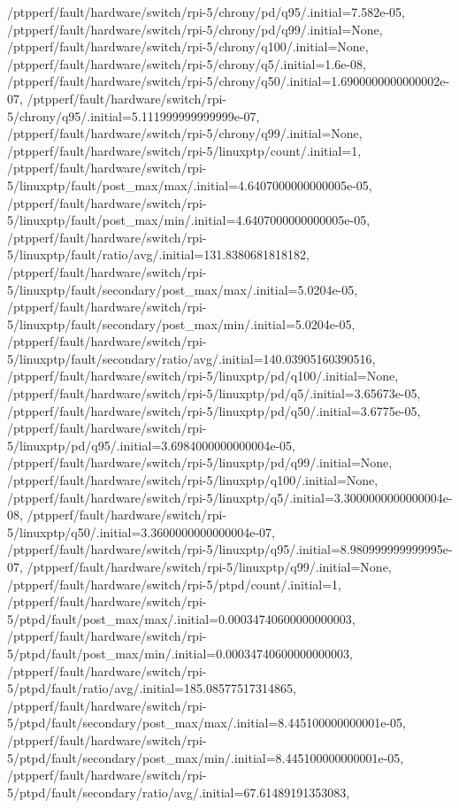 {    /ptpperf/fault/hardware/switch/rpi-5/chrony/pd/q95/.initial=7.582e-05,
    /ptpperf/fault/hardware/switch/rpi-5/chrony/pd/q99/.initial=None,
    /ptpperf/fault/hardware/switch/rpi-5/chrony/q100/.initial=None,
    /ptpperf/fault/hardware/switch/rpi-5/chrony/q5/.initial=1.6e-08,
    /ptpperf/fault/hardware/switch/rpi-5/chrony/q50/.initial=1.6900000000000002e-07,
    /ptpperf/fault/hardware/switch/rpi-5/chrony/q95/.initial=5.111999999999999e-07,
    /ptpperf/fault/hardware/switch/rpi-5/chrony/q99/.initial=None,
    /ptpperf/fault/hardware/switch/rpi-5/linuxptp/count/.initial=1,
    /ptpperf/fault/hardware/switch/rpi-5/linuxptp/fault/post_max/max/.initial=4.6407000000000005e-05,
    /ptpperf/fault/hardware/switch/rpi-5/linuxptp/fault/post_max/min/.initial=4.6407000000000005e-05,
    /ptpperf/fault/hardware/switch/rpi-5/linuxptp/fault/ratio/avg/.initial=131.8380681818182,
    /ptpperf/fault/hardware/switch/rpi-5/linuxptp/fault/secondary/post_max/max/.initial=5.0204e-05,
    /ptpperf/fault/hardware/switch/rpi-5/linuxptp/fault/secondary/post_max/min/.initial=5.0204e-05,
    /ptpperf/fault/hardware/switch/rpi-5/linuxptp/fault/secondary/ratio/avg/.initial=140.03905160390516,
    /ptpperf/fault/hardware/switch/rpi-5/linuxptp/pd/q100/.initial=None,
    /ptpperf/fault/hardware/switch/rpi-5/linuxptp/pd/q5/.initial=3.65673e-05,
    /ptpperf/fault/hardware/switch/rpi-5/linuxptp/pd/q50/.initial=3.6775e-05,
    /ptpperf/fault/hardware/switch/rpi-5/linuxptp/pd/q95/.initial=3.6984000000000004e-05,
    /ptpperf/fault/hardware/switch/rpi-5/linuxptp/pd/q99/.initial=None,
    /ptpperf/fault/hardware/switch/rpi-5/linuxptp/q100/.initial=None,
    /ptpperf/fault/hardware/switch/rpi-5/linuxptp/q5/.initial=3.3000000000000004e-08,
    /ptpperf/fault/hardware/switch/rpi-5/linuxptp/q50/.initial=3.3600000000000004e-07,
    /ptpperf/fault/hardware/switch/rpi-5/linuxptp/q95/.initial=8.980999999999995e-07,
    /ptpperf/fault/hardware/switch/rpi-5/linuxptp/q99/.initial=None,
    /ptpperf/fault/hardware/switch/rpi-5/ptpd/count/.initial=1,
    /ptpperf/fault/hardware/switch/rpi-5/ptpd/fault/post_max/max/.initial=0.00034740600000000003,
    /ptpperf/fault/hardware/switch/rpi-5/ptpd/fault/post_max/min/.initial=0.00034740600000000003,
    /ptpperf/fault/hardware/switch/rpi-5/ptpd/fault/ratio/avg/.initial=185.08577517314865,
    /ptpperf/fault/hardware/switch/rpi-5/ptpd/fault/secondary/post_max/max/.initial=8.445100000000001e-05,
    /ptpperf/fault/hardware/switch/rpi-5/ptpd/fault/secondary/post_max/min/.initial=8.445100000000001e-05,
    /ptpperf/fault/hardware/switch/rpi-5/ptpd/fault/secondary/ratio/avg/.initial=67.61489191353083,
}
